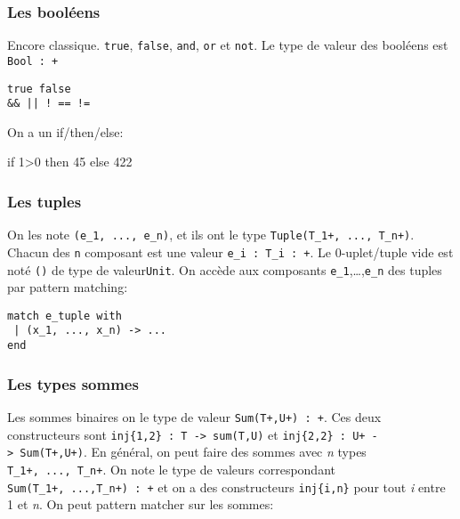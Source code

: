 \documentclass[
]{article}
\newenvironment{Shaded}{}{}
\newcommand{\NormalTok}[1]{#1}
\begin{document}
\hypertarget{les-booluxe9ens}{%
\subsubsection{Les booléens}\label{les-booluxe9ens}}

Encore classique. \texttt{true}, \texttt{false}, \texttt{and},
\texttt{or} et \texttt{not}. Le type de valeur des booléens est
\texttt{Bool\ :\ +}

\begin{verbatim}
true false 
&& || ! == !=
\end{verbatim}

On a un if/then/else:

\begin{Shaded}
\begin{Highlighting}[]
\NormalTok{if 1\textgreater{}0 then 45 else 422 }
\end{Highlighting}
\end{Shaded}

\hypertarget{les-tuples}{%
\subsubsection{Les tuples}\label{les-tuples}}

On les note \texttt{(e\_1,\ ...,\ e\_n)}, et ils ont le type
\texttt{Tuple(T\_1+,\ ...,\ T\_n+)}. Chacun des \texttt{n} composant est
une valeur \texttt{e\_i\ :\ T\_i\ :\ +}. Le 0-uplet/tuple vide est noté
\texttt{()} de type de valeur\texttt{Unit}. On accède aux composants
\texttt{e\_1},\ldots,\texttt{e\_n} des tuples par pattern matching:

\begin{verbatim}
match e_tuple with
 | (x_1, ..., x_n) -> ... 
end
\end{verbatim}

\hypertarget{les-types-sommes}{%
\subsubsection{Les types sommes}\label{les-types-sommes}}

Les sommes binaires on le type de valeur \texttt{Sum(T+,U+)\ :\ +}. Ces
deux constructeurs sont
\texttt{inj\{1,2\}\ :\ T\ -\textgreater{}\ sum(T,U)} et
\texttt{inj\{2,2\}\ :\ U+\ -\textgreater{}\ Sum(T+,U+)}. En général, on
peut faire des sommes avec \emph{n} types \texttt{T\_1+,\ ...,\ T\_n+}.
On note le type de valeurs correspondant
\texttt{Sum(T\_1+,\ ...,T\_n+)\ :\ +} et on a des constructeurs
\texttt{inj\{i,n\}} pour tout \emph{i} entre 1 et \emph{n}. On peut
pattern matcher sur les sommes:
\end{document}
